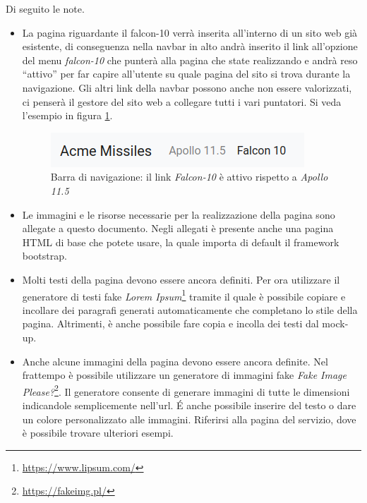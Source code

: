 \documentclass[addpoints,12pt,answers]{exam}
\begin{document}
    Di seguito le note.
    \begin{itemize}
        \item La pagina riguardante il falcon-10 verrà inserita all'interno di un sito web già esistente, di conseguenza nella navbar in alto andrà inserito il link all'opzione del menu \emph{falcon-10} che punterà alla pagina che state realizzando e andrà reso ``attivo'' per far capire all'utente su quale pagina del sito si trova durante la navigazione. Gli altri link della navbar possono anche non essere valorizzati, ci penserà il gestore del sito web a collegare tutti i vari puntatori. Si veda l'esempio in figura \ref{fig:navbar}.

        \begin{figure}
            \centering
            \includegraphics[scale=0.7]{img/navbar.png}
            \caption{Barra di navigazione: il link \emph{Falcon-10} è attivo rispetto a \emph{Apollo 11.5}}
            \label{fig:navbar}
        \end{figure}

        \item Le immagini e le risorse necessarie per la realizzazione della pagina sono allegate a questo documento. Negli allegati è presente anche una pagina HTML di base che potete usare, la quale importa di default il framework bootstrap.

        \item Molti testi della pagina devono essere ancora definiti. Per ora utilizzare il generatore di testi fake \emph{Lorem Ipsum}\footnote{\href{https://www.lipsum.com/}{https://www.lipsum.com/}} tramite il quale è possibile copiare e incollare dei paragrafi generati automaticamente che completano lo stile della pagina. Altrimenti, è anche possibile fare copia e incolla dei testi dal mock-up.

        \item Anche alcune immagini della pagina devono essere ancora definite. Nel frattempo è possibile utilizzare un generatore di immagini fake \emph{Fake Image Please?}\footnote{\href{https://fakeimg.pl/}{https://fakeimg.pl/}}. Il generatore consente di generare immagini di tutte le dimensioni indicandole semplicemente nell'url. \'E anche possibile inserire del testo o dare un colore personalizzato alle immagini. Riferirsi alla pagina del servizio, dove è possibile trovare ulteriori esempi.


\end{itemize}
\end{document}

